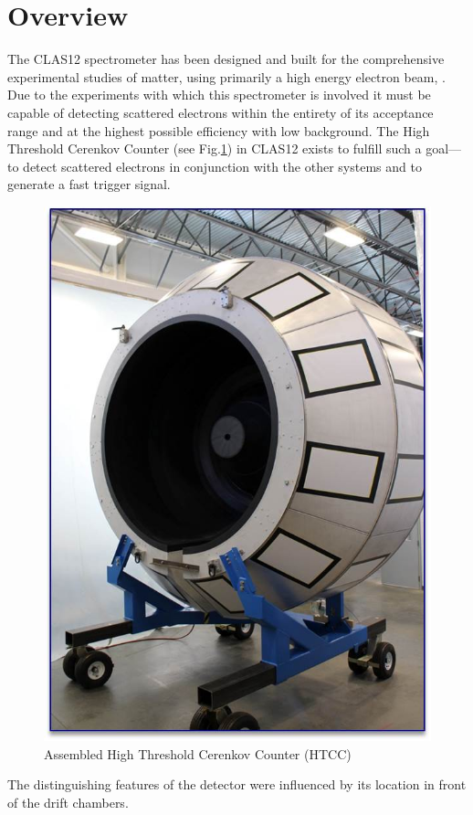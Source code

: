 \section{Overview}

The CLAS12 spectrometer has been designed and built for the comprehensive experimental studies of matter, using primarily a high energy electron beam, \cite{youris}. Due to the experiments with which this spectrometer is involved it must be capable of detecting scattered electrons within the entirety of its acceptance range and at the highest possible efficiency with low background. The High Threshold Cerenkov Counter (see Fig.\ref{fig:setup}) in CLAS12 exists to fulfill such a goal---to detect scattered electrons in conjunction with the other systems and to generate a fast trigger signal. 
\begin{figure}[h]
    \centering
    \includegraphics[width=0.75\linewidth]{Picture1.jpg}
    \caption{Assembled High Threshold Cerenkov Counter (HTCC)}
    \label{fig:setup}
\end{figure}{}
The distinguishing features of the detector were influenced by its location in front of the drift chambers. 

